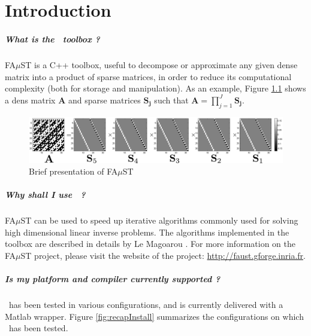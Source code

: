 \chapter{Introduction}\label{sec:intro}

\paragraph{What is the \FAuST\ toolbox ?} FA$\mu$ST is a C++ toolbox, useful to decompose or approximate any given dense matrix into a product of sparse matrices, in order to reduce its computational complexity (both for storage and manipulation). 
As an example, Figure \ref{fig:presentation} shows a dens matrix \textbf{A} and sparse matrices $\mathbf{S_j}$ such that $\mathbf{A}=\prod_{j=1}^J\mathbf{S_j}$.

\begin{figure}[H] %
\centering
\includegraphics[scale=0.5]{images/hadamard32_bw.pdf}
\caption{Brief presentation of FA$\mu$ST}
\label{fig:presentation}
\end{figure}

\paragraph{Why shall I use \FAuST\ ?} FA$\mu$ST can be used to speed up iterative algorithms commonly used for solving high dimensional linear inverse problems. The algorithms implemented in the toolbox are described in details by Le Magoarou \cite{LeMagoarou2016}. For more information on the FA$\mu$ST project, please visit the website of the project: \url{http://faust.gforge.inria.fr}.



\paragraph{Is my platform and compiler currently supported ?} 
\FAuST\ has been tested in various configurations, and is currently delivered with a Matlab wrapper. Figure \ref{fig:recapInstall} summarizes the configurations on which \FAuST\ has been tested. 

